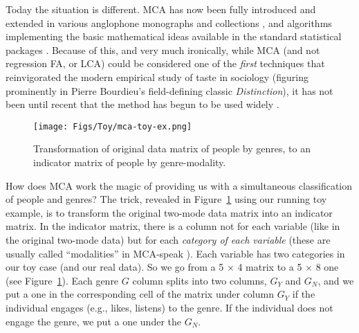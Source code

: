 Today the situation is different. MCA has now been fully introduced and extended in various anglophone monographs and collections \citep{leroux_rouanet04, greenacre_blasius06}, and algorithms implementing the basic mathematical ideas available in the standard statistical packages \citep{le_etal08}. Because of this, and very much ironically, while MCA (and not regression FA, or LCA) could be considered one of the {\em first} techniques that reinvigorated the modern empirical study of taste in sociology (figuring prominently in Pierre Bourdieu's \citeyearpar{bourdieu84} field-defining classic \emph{Distinction}), it has not been until recent that the method has begun to be used widely \citep[see][among many others]{flemmen_etal18, roose_etal12, savage_gayo11}.  
 \begin{figure}[ht!]
 \centering
 \texttt{[image: Figs/Toy/mca-toy-ex.png]}
 \caption{\footnotesize Transformation of original data matrix of people by genres, to an indicator matrix of people by genre-modality.}
  \label{fig:mca-toy}
 \end{figure}
 
 How does MCA work the magic of providing us with a simultaneous classification of people and genres? The trick, revealed in Figure~\ref{fig:mca-toy} using our running toy example, is to transform the original two-mode data matrix into an indicator matrix. In the indicator matrix, there is a column not for each variable (like in the original two-mode data) but for each {\em category of each variable} (these are usually called ``modalities'' in MCA-speak \citep{leroux_rouanet04}). Each variable has two categories in our toy case (and our real data). So we go from a 5 $\times$ 4 matrix to a 5 $\times$ 8 one (see Figure~\ref{fig:mca-toy}). Each genre $G$ column splits into two columns, $G_Y$ and $G_N$, and we put a one in the corresponding cell of the matrix under column $G_Y$ if the individual engages (e.g., likes, listens) to the genre. If the individual does not engage the genre, we put a one under the $G_N$. 
 
